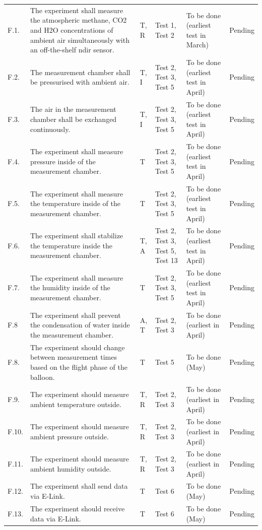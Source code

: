 \documentclass[12pt,a4paper]{report}
\begin{document}
\begin{longtable}{L{0.7cm}L{5cm}L{1.5cm}L{2cm}L{2.5cm}L{2cm}}
F.1. & The experiment shall measure the atmospheric methane, CO2 and H2O concentrations of ambient air simultaneously with an off-the-shelf \ac{ndir} sensor. & T, R & Test 1, Test 2 & To be done (earliest test in March) & Pending \\
F.2. & The measurement chamber shall be pressurised with ambient air. & T, I & Test 2, Test 3, Test 5 & To be done (earliest test in April) & Pending \\
F.3. & The air in the measurement chamber shall be exchanged continuously. & T, I & Test 2, Test 3, Test 5 & To be done (earliest test in April) & Pending \\
F.4. & The experiment shall measure pressure inside of the measurement chamber. & T & Test 2, Test 3, Test 5 & To be done (earliest test in April) & Pending \\
F.5. & The experiment shall measure the temperature inside of the measurement chamber. & T & Test 2, Test 3, Test 5 & To be done (earliest test in April) & Pending \\
F.6. & The experiment shall stabilize the temperature inside the measurement chamber. & T, A & Test 2, Test 3, Test 5, Test 13 & To be done (earliest test in April) & Pending \\
F.7. & The experiment shall measure the humidity inside of the measurement chamber. & T & Test 2, Test 3, Test 5 & To be done (earliest test in April) & Pending \\
F.8 & The experiment shall prevent the condensation of water inside the measurement chamber. & A, T & Test 2, Test 3 & To be done (earliest in April) & Pending \\
F.8. & The experiment should change between measurement times based on the flight phase of the balloon. & T & Test 5 & To be done (May) & Pending \\
F.9. & The experiment should measure ambient temperature outside. & T, R & Test 2, Test 3 & To be done (earliest in April) & Pending \\
F.10. & The experiment should measure ambient pressure outside. & T, R & Test 2, Test 3 & To be done (earliest in April) & Pending \\
F.11. & The experiment should measure ambient humidity outside. & T, R & Test 2, Test 3 & To be done (earliest in April) & Pending \\
F.12. & The experiment shall send data via E-Link. & T & Test 6 & To be done (May) & Pending \\
F.13. & The experiment should receive data via E-Link. & T & Test 6 & To be done (May) & Pending \\

\end{longtable}
\end{document}
